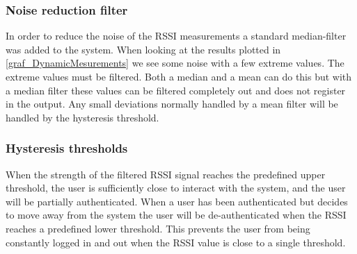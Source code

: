 

\subsubsection{Noise reduction filter}
In order to reduce the noise of the RSSI measurements a standard median-filter was added to the system.
When looking at the results plotted in \cref{graf_DynamicMesurements} we see some noise with a few extreme values.
The extreme values must be filtered. Both a median and a mean can do this but with a median filter these values can be filtered completely out and does not register in the output. Any small deviations normally handled by a mean filter will be handled by the hysteresis threshold.

\subsubsection{Hysteresis thresholds}
When the strength of the filtered RSSI signal reaches the predefined upper threshold, the user is sufficiently close to interact with the system, and the user will be partially authenticated.
When a user has been authenticated but decides to move away from the system the user will be de-authenticated when the RSSI reaches a predefined lower threshold.
This prevents the user from being constantly logged in and out when the RSSI value is close to a single threshold.
